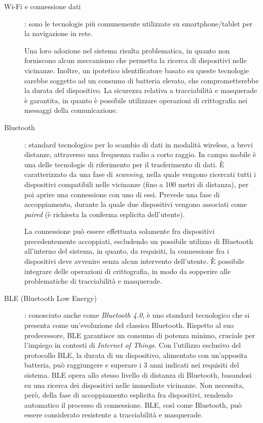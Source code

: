 \documentclass[a4paper,12pt]{report}
\begin{document}
\begin{description}
	\item[Wi-Fi e connessione dati]: sono le tecnologie più comunemente utilizzate su smartphone/tablet per la navigazione in rete. 
	
	Una loro adozione nel sistema risulta problematica, in quanto non forniscono alcun meccanismo che permetta la ricerca di dispositivi nelle vicinanze. Inoltre, un ipotetico identificatore basato su queste tecnologie sarebbe soggetto ad un consumo di batteria elevato, che comprometterebbe la durata del dispositivo. La sicurezza relativa a tracciabilità e masquerade è garantita, in quanto è possibile utilizzare operazioni di crittografia nei messaggi della comunicazione.
	
	\item[Bluetooth]: standard tecnologico per lo scambio di dati in modalità wireless, a brevi distanze, attraverso una frequenza radio a corto raggio. In campo mobile è una delle tecnologie di riferimento per il trasferimento di dati. È caratterizzato da una fase di \emph{scanning}, nella quale vengono ricercati tutti i dispositivi compatibili nelle vicinanze (fino a 100 metri di distanza), per poi aprire una connessione con uno di essi. Prevede una fase di accoppiamento, durante la quale due dispositivi vengono associati come \emph{paired} (è richiesta la conferma esplicita dell'utente). 
	
	La connessione può essere effettuata solamente fra dispositivi precedentemente accoppiati, escludendo un possibile utilizzo di Bluetooth all'interno del sistema, in quanto, da requisiti, la connessione fra i dispositivi deve avvenire senza alcun intervento dell'utente. È possibile integrare delle operazioni di crittografia, in modo da sopperire alle problematiche di tracciabilità e masquerade.
	
	\item[BLE (Bluetooth Low Energy)]: conosciuto anche come \emph{Bluetooth 4.0}, è uno standard tecnologico che si presenta come un'evoluzione del classico Bluetooth. Rispetto al suo predecessore, BLE garantisce un consumo di potenza minimo, cruciale per l'impiego in contesti di \emph{Internet of Things}. Con l'utilizzo esclusivo del protocollo BLE, la durata di un dispositivo, alimentato con un'apposita batteria, può raggiungere e superare i 3 anni indicati nei requisiti del sistema. BLE opera allo stesso livello di distanza di Bluetooth, basandosi su una ricerca dei dispositivi nelle immediate vicinanze. Non necessita, però, della fase di accoppiamento esplicita fra dispositivi, rendendo automatico il processo di connessione. BLE, così come Bluetooth, può essere considerato resistente a tracciabilità e masquerade.
	

\end{description}
\end{document}
